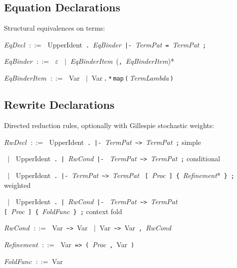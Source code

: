 \documentclass[11pt,a4paper]{article}
\newcommand{\kw}[1]{\texttt{\textcolor{kw}{#1}}}       %
\newcommand{\sym}[1]{\texttt{#1}}                       %
\newcommand{\nt}[1]{\textit{\textcolor{nt}{#1}}}        %
\newcommand{\tok}[1]{\textsf{#1}}                       %
\newcommand{\OR}{\ensuremath{\;\mid\;}}                  %
\newcommand{\EPS}{\ensuremath{\varepsilon}}              %
\newcommand{\bnfdef}{\ensuremath{\;::=\;}}               %
\newenvironment{grammar}{%
  \par\smallskip\begin{list}{}{%
    \setlength{\leftmargin}{1.5em}%
    \setlength{\itemsep}{2pt}%
    \setlength{\parsep}{0pt}}%
}{\end{list}\smallskip}
\begin{document}
\subsection{Equation Declarations}

Structural equivalences on terms:

\begin{grammar}
\item \nt{EqDecl} \bnfdef
    \tok{UpperIdent}~\sym{.}~\nt{EqBinder}~\sym{|-}~\nt{TermPat}~\sym{=}~\nt{TermPat}~\sym{;}
\item \nt{EqBinder} \bnfdef
    \EPS
    \OR \nt{EqBinderItem}~(\sym{,}~\nt{EqBinderItem})*
\item \nt{EqBinderItem} \bnfdef
    \tok{Var}
    \OR \tok{Var}\,\sym{.}\,\sym{*}\,\kw{map}\,\sym{(}\,\nt{TermLambda}\,\sym{)}
\end{grammar}

\subsection{Rewrite Declarations}

Directed reduction rules, optionally with Gillespie stochastic weights:

\begin{grammar}
\item \nt{RwDecl} \bnfdef
    \tok{UpperIdent}~\sym{.}~\sym{|-}~\nt{TermPat}~\sym{\~{}>}~\nt{TermPat}~\sym{;}
    \hfill\textcolor{cmt}{simple}
\item \phantom{\nt{RwDecl}} \OR
    \tok{UpperIdent}~\sym{.}~\sym{|}~\nt{RwCond}~\sym{|-}~%
    \nt{TermPat}~\sym{\~{}>}~\nt{TermPat}~\sym{;}
    \hfill\textcolor{cmt}{conditional}
\item \phantom{\nt{RwDecl}} \OR
    \tok{UpperIdent}~\sym{.}~\sym{|-}~\nt{TermPat}~\sym{\~{}>}~\nt{TermPat}~%
    \sym{[}~\nt{Proc}~\sym{]}~\sym{\{}~\nt{Refinement}*~\sym{\}}~\sym{;}
    \hfill\textcolor{cmt}{weighted}
\item \phantom{\nt{RwDecl}} \OR
    \tok{UpperIdent}~\sym{.}~\sym{|}~\nt{RwCond}~\sym{|-}~%
    \nt{TermPat}~\sym{\~{}>}~\nt{TermPat}~%
    \sym{[}~\nt{Proc}~\sym{]}~\sym{\{}~\nt{FoldFunc}~\sym{\}}~\sym{;}
    \hfill\textcolor{cmt}{context fold}
\item \nt{RwCond} \bnfdef
    \tok{Var}~\sym{\~{}>}~\tok{Var}
    \OR \tok{Var}~\sym{\~{}>}~\tok{Var}~\sym{,}~\nt{RwCond}
\item \nt{Refinement} \bnfdef
    \tok{Var}~\sym{=>}~\sym{(}~\nt{Proc}~\sym{,}~\tok{Var}~\sym{)}
\item \nt{FoldFunc} \bnfdef \tok{Var}
\end{grammar}
\end{document}

